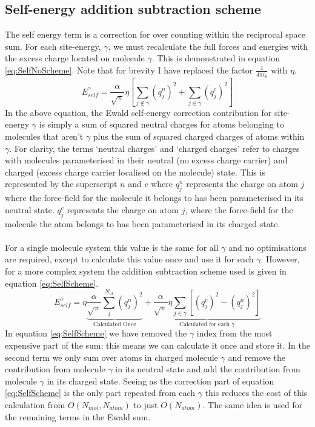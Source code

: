 \subsection{Self-energy addition subtraction scheme}
The self energy term is a correction for over counting within the reciprocal space sum. For each site-energy, $\gamma$, we must recalculate the full forces and energies with the excess charge located on molecule $\gamma$. This is demonstrated in equation \eqref{eq:SelfNoScheme}. Note that for brevity I have replaced the factor $\frac{1}{4 \pi \epsilon_0}$ with $\eta$.
\begin{equation}
  E_{self}^{\gamma} = \frac{\alpha}{\sqrt{\pi}} \eta \left[\sum_{j \not\in \gamma} \left(q^{n}_{j}\right)^2  + \sum_{j \in \gamma} \left(q^{c}_{j}\right)^2\right]
  \label{eq:SelfNoScheme}
\end{equation}
In the above equation, the Ewald self-energy correction contribution for site-energy $\gamma$ is simply a sum of squared neutral charges for atoms belonging to molecules that aren't $\gamma$ plus the sum of squared charged charges of atoms within $\gamma$. For clarity, the terms `neutral charges' and `charged charges' refer to charges with molecules parameterised in their neutral (no excess charge carrier) and charged (excess charge carrier localised on the molecule) state. This is represented by the superscript $n$ and $c$ where $q^{n}_{j}$ represents the charge on atom $j$ where the force-field for the molecule it belongs to has been parameterised in its neutral state. $q^{c}_{j}$ represents the charge on atom $j$, where the force-field for the molecule the atom belongs to has been parameterised in its charged state.
\\\\
For a single molecule system this value is the same for all $\gamma$ and no optimisations are required, except to calculate this value once and use it for each $\gamma$. However, for a more complex system the addition subtraction scheme used is given in equation \eqref{eq:SelfScheme}.
\begin{equation}
  E_{self}^{\gamma} = \eta \underbrace{\frac{\alpha}{\sqrt{\pi}} \sum_{j}^{N_{at}}\left(q_{j}^{n}\right)^2}_{\text{Calculated Once}} + \underbrace{\frac{\alpha}{\sqrt{\pi}} \eta \sum_{j \in \gamma} \left[ (q^{c}_{j})^2 - (q^{n}_{j})^2 \right]}_{\text{Calculated for each $\gamma$}}
  \label{eq:SelfScheme}
\end{equation}
In equation \eqref{eq:SelfScheme} we have removed the $\gamma$ index from the most expensive part of the sum; this means we can calculate it once and store it. In the second term we only sum over atoms in charged molecule $\gamma$ and remove the contribution from molecule $\gamma$ in its neutral state and add the contribution from molecule $\gamma$ in its charged state. Seeing as the correction part of equation \eqref{eq:SelfScheme} is the only part repeated from each $\gamma$ this reduces the cost of this calculation from $O(N_{mol}, N_{atom})$ to just $O(N_{atom})$. The same idea is used for the remaining terms in the Ewald sum.
